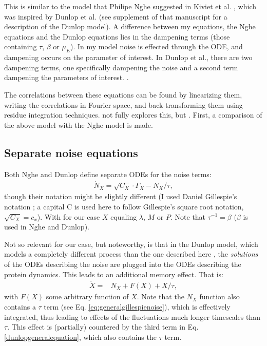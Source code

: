 This is similar to the model that Philipe Nghe suggested in Kiviet et al. \cite{Kiviet2014}, which was inspired by Dunlop et al. \cite{Dunlop2008} (see supplement of that manuscript for a description of the Dunlop model).
%
A difference between my equations, the Nghe equations and the Dunlop equations lies in the dampening terms (those containing $\tau$, $\beta$ or $\mu_E$). In my model noise is effected through the ODE, and dampening occurs on the parameter of interest. In Dunlop et al., there are two dampening terms, one specifically dampening the noise and a second term dampening the parameters of interest. .

The correlations between these equations can be found by linearizing them, writing the correlations in Fourier space, and back-transforming them using residue integration techniques. 
 not fully explores this, but .
First, a comparison of the above model with the Nghe model is made.

\subsection*{Separate noise equations}

Both Nghe and Dunlop define separate ODEs for the noise terms:
%
\begin{align}
\label{eq:generalgillespienoise}
\dot{N}_X = \sqrt{C_X} \cdot \Gamma_X - N_X/\tau
,
\end{align}
%
though their notation might be slightly different (I used Daniel Gillespie's notation \cite{Gillespie1996}; a capital C is used here to follow Gillespie's square root notation, $\sqrt{C_X}=c_x$).
With for our case $X$ equaling $\lambda$, $M$ or $P$. Note that $\tau^{-1}=\beta$ ($\beta$ is used in Nghe and Dunlop).

Not so relevant for our case, but noteworthy, is that in the Dunlop model, which models a completely different process than the one described here \cite{Dunlop2008}, the \textit{solutions} of the ODEs describing the noise are plugged into the ODEs describing the protein dynamics. This leads to an additional memory effect.
%
That is:
%
\begin{align}
\label{dunlopgeneralequation}
\dot{X} = & N_X  + F(X) + X/\tau
,
\end{align}
%
with $F(X)$ some arbitrary function of $X$. 
Note that the $N_X$ function also contains a $\tau$ term (see Eq. \ref{eq:generalgillespienoise}), which is effectively integrated, thus leading to effects of the fluctuations much longer timescales than $\tau$. 
This effect is (partially) countered by the third term in Eq. \ref{dunlopgeneralequation}, which also contains the $\tau$ term.

